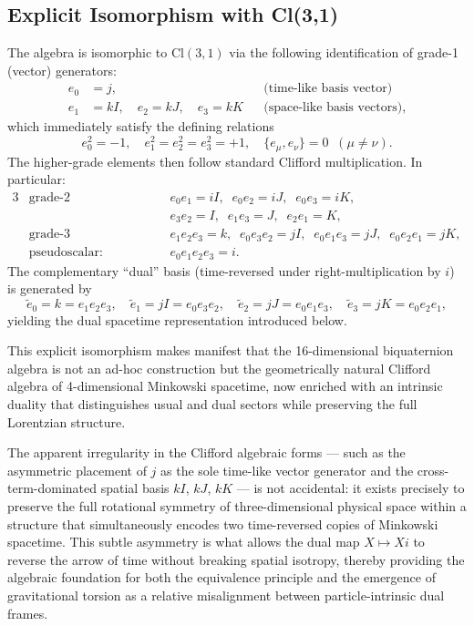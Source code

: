 \documentclass[a4paper]{article}
\begin{document}
\subsection{Explicit Isomorphism with Cl(3,1)}

The algebra is isomorphic to $\mathrm{Cl}(3,1)$ via the following identification of grade-1 (vector) generators:
\begin{align*}
  e_0 &= j,                    & &\text{(time-like basis vector)}\\[4pt]
  e_1 &= kI, \quad e_2 = kJ, \quad e_3 = kK & &\text{(space-like basis vectors)},
\end{align*}
which immediately satisfy the defining relations
\[
e_0^2 = -1, \quad e_1^2 = e_2^2 = e_3^2 = +1, \quad \{e_\mu,e_\nu\} = 0 \;\; (\mu \neq \nu).
\]
The higher-grade elements then follow standard Clifford multiplication. In particular:
\begin{alignat*}{3}
  &\text{grade-2 (bivectors):}  &\quad& e_0e_1 = iI, \;\; e_0e_2 = iJ, \;\; e_0e_3 = iK, \\
  &&& e_3e_2 = I,   \;\; e_1e_3 = J,   \;\; e_2e_1 = K, \\[6pt]
  &\text{grade-3 (trivectors):} && e_1e_2e_3 = k, \;\; e_0e_3e_2 = jI, \;\; e_0e_1e_3 = jJ, \;\; e_0e_2e_1 = jK, \\[6pt]
  &\text{pseudoscalar:}        && e_0e_1e_2e_3 = i.
\end{alignat*}
The complementary ``dual'' basis (time-reversed under right-multiplication by $i$) is generated by
\[
\tilde{e}_0 = k = e_1e_2e_3, \quad \tilde{e}_1 = jI = e_0e_3e_2, \quad \tilde{e}_2 = jJ = e_0e_1e_3, \quad \tilde{e}_3 = jK = e_0e_2e_1,
\]
yielding the dual spacetime representation introduced below.

This explicit isomorphism makes manifest that the 16-dimensional biquaternion algebra is not an ad-hoc construction but the geometrically natural Clifford algebra of 4-dimensional Minkowski spacetime, now enriched with an intrinsic duality that distinguishes usual and dual sectors while preserving the full Lorentzian structure.

The apparent irregularity in the Clifford algebraic forms — such as the asymmetric placement of $j$ as the sole time-like vector generator and the cross-term-dominated spatial basis $kI$, $kJ$, $kK$ — is not accidental: it exists precisely to preserve the full rotational symmetry of three-dimensional physical space within a structure that simultaneously encodes two time-reversed copies of Minkowski spacetime. This subtle asymmetry is what allows the dual map $X \mapsto Xi$ to reverse the arrow of time without breaking spatial isotropy, thereby providing the algebraic foundation for both the equivalence principle and the emergence of gravitational torsion as a relative misalignment between particle-intrinsic dual frames.
\end{document}
